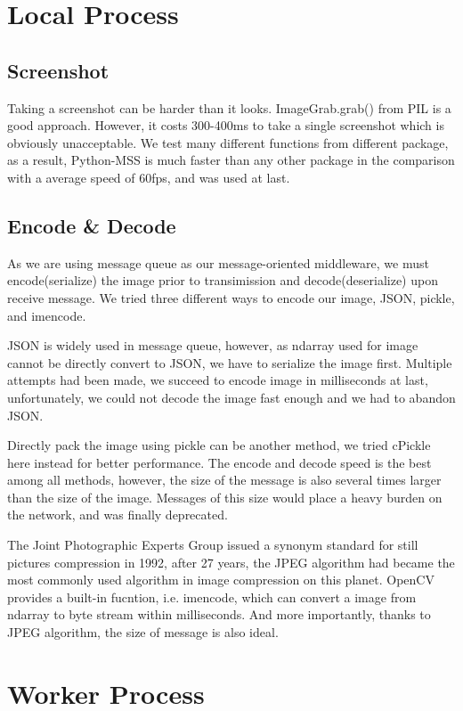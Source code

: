 \documentclass[runningheads]{llncs}
\begin{document}
\section{Local Process}
\subsection{Screenshot}
Taking a screenshot can be harder than it looks. 
ImageGrab.grab() from PIL is a good approach. However, 
it costs 300-400ms to take a single screenshot which is 
obviously unacceptable. We test many different functions 
from different package, as a result, Python-MSS is much 
faster than any other package in the comparison with a 
average speed of 60fps, and was used at last.

\subsection{Encode \& Decode}
As we are using message queue as our message-oriented 
middleware, we must encode(serialize) the image prior to 
transimission and decode(deserialize) upon receive message. 
We tried three different ways to encode our image, JSON, 
pickle, and imencode. 

JSON is widely used in message queue, however, as ndarray 
used for image cannot be directly convert to JSON, we have 
to serialize the image first. Multiple attempts had been 
made, we succeed to encode image in milliseconds at last, 
unfortunately, we could not decode the image fast enough 
and we had to abandon JSON. 

Directly pack the image using pickle can be another method, 
we tried cPickle here instead for better performance. The 
encode and decode speed is the best among all methods, 
however, the size of the message is also several times 
larger than the size of the image. Messages of this size 
would place a heavy burden on the network, and was finally 
deprecated. 

The Joint Photographic Experts Group issued a synonym 
standard for still pictures compression in 1992, after 
27 years, the JPEG algorithm had became the most commonly 
used algorithm in image compression on this planet. OpenCV 
provides a built-in fucntion, i.e. imencode, which can 
convert a image from ndarray to byte stream within 
milliseconds. And more importantly, thanks to JPEG 
algorithm, the size of message is also ideal. 


\section{Worker Process}
\end{document}
